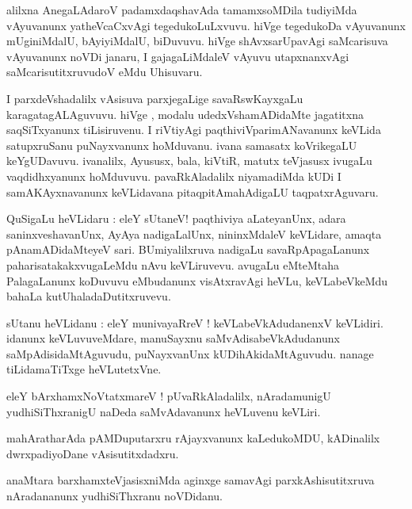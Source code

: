 \documentclass{article}
\begin{document}
\begin{mn}
alilxna AnegaLAdaroV padamxdaqshavAda tamamxsoMDila tudiyiMda vAyuvanunx yatheVcaCxvAgi 
tegedukoLuLxvuvu. hiVge tegedukoDa vAyuvanunx mUginiMdalU, bAyiyiMdalU,
biDuvuvu. hiVge shAvxsarUpavAgi saMcarisuva vAyuvanunx noVDi janaru, I gajagaLiMdaleV vAyuvu
utapxnanxvAgi saMcarisutitxruvudoV eMdu Uhisuvaru.
\end{mn}

\begin{mn}
I parxdeVshadalilx vAsisuva  parxjegaLige savaRswKayxgaLu karagatagALAguvuvu.
hiVge , modalu udedxVshamADidaMte jagatitxna saqSiTxyanunx tiLisiruvenu. I riVtiyAgi 
paqthiviVparimANavanunx keVLida satupxruSanu puNayxvanunx hoMduvanu. ivana samasatx
koVrikegaLU keYgUDavuvu. ivanalilx, Ayususx, bala, kiVtiR, matutx teVjasusx ivugaLu vaqdidhxyanunx
hoMduvuvu. pavaRkAladalilx niyamadiMda kUDi I samAKAyxnavanunx keVLidavana pitaqpitAmahAdigaLU 
taqpatxrAguvaru.
\end{mn}


\begin{mn}
QuSigaLu heVLidaru : eleY sUtaneV! paqthiviya aLateyanUnx, adara saninxveshavanUnx, AyAya
nadigaLalUnx, nininxMdaleV keVLidare, amaqta pAnamADidaMteyeV sari. BUmiyalilxruva nadigaLu 
savaRpApagaLanunx paharisatakakxvugaLeMdu nAvu keVLiruvevu. avugaLu eMteMtaha PalagaLanunx koDuvuvu
eMbudanunx visAtxravAgi heVLu, keVLabeVkeMdu bahaLa kutUhaladaDutitxruvevu.
\end{mn}


\begin{mn}
sUtanu heVLidanu : eleY munivayaRreV ! keVLabeVkAdudanenxV keVLidiri. idanunx keVLuvuveMdare, 
manuSayxnu saMvAdisabeVkAdudanunx saMpAdisidaMtAguvudu, puNayxvanUnx kUDihAkidaMtAguvudu.
nanage tiLidamaTiTxge heVLutetxVne.
\end{mn}

\begin{mn}
eleY bArxhamxNoVtatxmareV ! pUvaRkAladalilx, nAradamunigU yudhiSiThxranigU naDeda saMvAdavanunx 
heVLuvenu keVLiri.
\end{mn}

\begin{mn}
mahAratharAda pAMDuputarxru rAjayxvanunx kaLedukoMDU, kADinalilx dwrxpadiyoDane vAsisutitxdadxru.
\end{mn}

\begin{mn}
anaMtara barxhamxteVjasisxniMda aginxge samavAgi parxkAshisutitxruva nAradananunx yudhiSiThxranu 
noVDidanu.
\end{mn}
\end{document}
